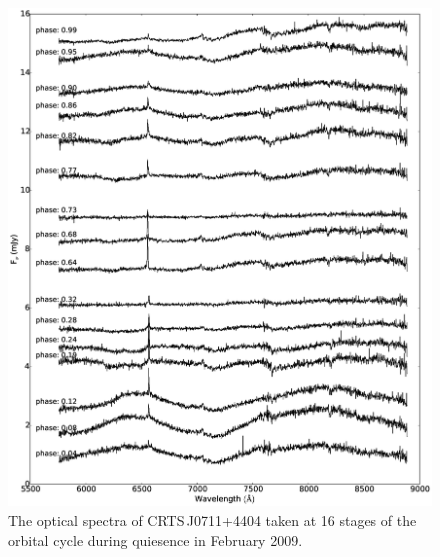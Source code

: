 \documentclass[a4paper,fleqn,usenatbib]{mnras}
\begin{document}
\begin{figure}
\centering
\includegraphics[width=\textwidth]{images/CSS081231_spectra_q.eps}
\caption[Caption for spectra]{The optical spectra of CRTS\,J0711+4404 taken at 16 stages of the orbital cycle during quiesence in February 2009.  }
\label{fig:spectra-quiescent}
\end{figure}
\end{document}
